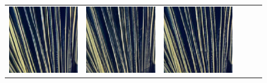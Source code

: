 \begin{figure}[!ht]
\begin{tabular}[t]{c c c c c c}
    \includegraphics[width=\xwidth]{cp2/figures/sr/scaling_sr_c160_1.png} &
    \includegraphics[width=\xwidth]{cp2/figures/sr/scaling_sr_c192_1.png} &
    \includegraphics[width=\xwidth]{cp2/figures/sr/scaling_sr_c224_1.png}

\end{tabular}
\end{figure}
